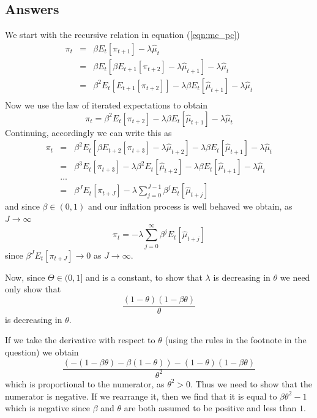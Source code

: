 \documentclass[authoryear,11pt]{elsarticle}
\begin{document}
\subsection*{Answers}
We start with the recursive relation in equation (\ref{eqn:mc_pc})
\begin{eqnarray*}
\pi_{t} 	&=& \beta E_{t}[ \pi_{t+1} ] - \lambda \hat{\mu}_{t} \\
		&=& \beta  E_{t}[ \beta E_{t+1}[ \pi_{t+2} ] - \lambda \hat{\mu}_{t+1} ] - \lambda \hat{\mu}_{t} \\
		&=& \beta^2  E_{t}[ E_{t+1}[ \pi_{t+2} ] ] - \lambda \beta E_{t}[ \hat{\mu}_{t+1} ] - \lambda \hat{\mu}_{t} \\
\end{eqnarray*}
Now we use the law of iterated expectations to obtain
\[
\pi_{t} 	= \beta^2  E_{t}[ \pi_{t+2}] - \lambda \beta E_{t}[ \hat{\mu}_{t+1} ] - \lambda \hat{\mu}_{t}
\]
Continuing, accordingly we can write this as
\begin{eqnarray*}
\pi_{t} 	&=&\beta^2  E_{t}[ \beta E_{t+2}[ \pi_{t+3} ] - \lambda \hat{\mu}_{t+2} ] - \lambda \beta E_{t}[ \hat{\mu}_{t+1} ] - \lambda \hat{\mu}_{t} \\
	&=& \beta^3  E_{t}[ \pi_{t+3}] - \lambda \beta^2 E_{t}[ \hat{\mu}_{t+2} ]- \lambda \beta E_{t}[ \hat{\mu}_{t+1} ] - \lambda \hat{\mu}_{t} \\
	&\ldots& \\
	&=& \beta^{J} E_{t}[ \pi_{t+J} ] - \lambda \sum\limits_{j=0}^{J-1} \beta^{j} E_{t}[ \hat{\mu}_{t+j} ]
\end{eqnarray*}
and since $\beta \in (0,1)$ and our inflation process is well behaved we obtain, as $J \to \infty$
\[
\pi_{t} = - \lambda \sum\limits_{j=0}^{\infty} \beta^{j} E_{t}[ \hat{\mu}_{t+j} ]
\]
since $\beta^{J} E_{t}[ \pi_{t+J} ] \to 0$ as $J\to \infty$.

Now, since $\Theta \in (0,1]$ and is a constant, to show that $\lambda$ is decreasing in $\theta$ we need only show that
\[
\frac{(1-\theta)(1-\beta\theta)}{\theta}
\]
is decreasing in $\theta$.

If we take the derivative with respect to $\theta$ (using the rules in the footnote in the question) we obtain
\[
\frac{(-(1-\beta \theta)-\beta(1-\theta)) - (1-\theta)(1-\beta \theta)}{\theta^{2}}
\]
which is proportional to the numerator, as $\theta^2 > 0$. Thus we need to show that the numerator is negative. If we rearrange it, then we find that it is equal to $\beta \theta^2 - 1$ which is negative since $\beta$ and $\theta$ are both assumed to be positive and less than $1$.
\end{document}
